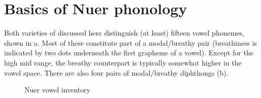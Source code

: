 \documentclass[output=paper,newtxmath,modfonts,nonflat]{langsci/langscibook}
\begin{document}
\section{Basics of Nuer phonology} %

Both varieties of  discussed here distinguish (at least) fifteen vowel phonemes, shown in a. Most of these constitute part of a modal/breathy pair (breathiness is indicated by two dots underneath the first grapheme of a vowel). Except for the high mid range, the breathy counterpart is typically somewhat higher in the vowel space. There are also four pairs of modal/breathy diphthongs (b). 



\begin{figure}
%
	\caption{Nuer vowel inventory}
	\label{fig:monich:1}
\end{figure}
\end{document}
